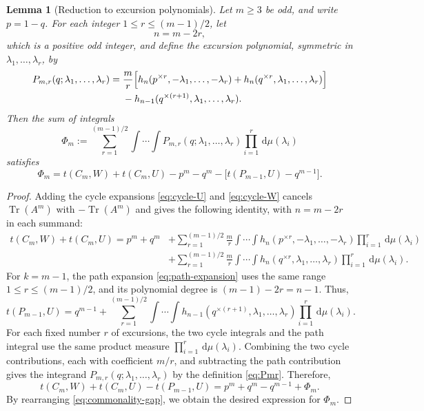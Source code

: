 \documentclass[11pt]{article}
\newtheorem{lemma}[theorem]{Lemma}
\theoremstyle{remark}
\numberwithin{equation}{section}
\newcommand{\Tr}{\operatorname{Tr}}
\newcommand{\dd}{\,\mathrm d}
\newcommand{\tC}[2]{t(C_{#1},#2)}
\newcommand{\tP}[2]{t(P_{#1},#2)}
\newcommand{\rep}[2]{#1^{\times #2}}
\begin{document}
\begin{lemma}[Reduction to excursion polynomials]
\label{lem:polynomial-reduction}
  Let $m\ge3$ be odd, and write $p=1-q$. For each integer
  $1\le r\le(m-1)/2$, let
  \begin{equation}\label{eq:pge23-n}
    n=m-2r,
  \end{equation}
  which is a positive odd integer, and define the excursion polynomial,
  symmetric in $\lambda_1,\ldots,\lambda_r$, by
  \begin{align}
    P_{m,r}(q;\lambda_1,\ldots,\lambda_r)
    ={}&\frac mr\Bigl[
      h_n(\rep pr,-\lambda_1,\ldots,-\lambda_r)
      +h_n(\rep qr,\lambda_1,\ldots,\lambda_r)
    \Bigr]\notag\\
    &-h_{n-1}(\rep q{(r+1)},\lambda_1,\ldots,\lambda_r).
    \label{eq:Pmr}
  \end{align}
  Then the sum of integrals
  \begin{equation}\label{eq:Phi-expansion}
    \Phi_m:=\sum_{r=1}^{(m-1)/2}
      \int\!\cdots\!\int
      P_{m,r}(q;\lambda_1,\ldots,\lambda_r)
      \prod_{i=1}^r\dd\mu(\lambda_i)
  \end{equation}
  satisfies
  \[
    \Phi_m=\tC mW+\tC mU-p^m-q^m
    -\bigl[\tP{m-1}U-q^{m-1}\bigr].
  \]
\end{lemma}

\begin{proof}
  Adding the cycle expansions \eqref{eq:cycle-U} and
  \eqref{eq:cycle-W} cancels $\Tr(A^m)$ with $-\Tr(A^m)$ and gives the
  following identity, with $n=m-2r$ in each summand:
  \[
    \begin{aligned}
      \tC mW+\tC mU
      ={}p^m+q^m
      &+\sum_{r=1}^{(m-1)/2}\frac mr
      \int\!\cdots\!\int
        h_n(\rep pr,-\lambda_1,\ldots,-\lambda_r)
      \prod_{i=1}^r\dd\mu(\lambda_i)\\
      &+\sum_{r=1}^{(m-1)/2}\frac mr
      \int\!\cdots\!\int
        h_n(\rep qr,\lambda_1,\ldots,\lambda_r)
      \prod_{i=1}^r\dd\mu(\lambda_i).
    \end{aligned}
  \]
  For $k=m-1$, the path expansion \eqref{eq:path-expansion} uses the
  same range $1\le r\le(m-1)/2$, and its polynomial degree is
  $(m-1)-2r=n-1$. Thus,
  \[
    \tP{m-1}U=q^{m-1}+
    \sum_{r=1}^{(m-1)/2}
      \int\!\cdots\!\int
      h_{n-1}(\rep q{(r+1)},\lambda_1,\ldots,\lambda_r)
      \prod_{i=1}^r\dd\mu(\lambda_i).
  \]
  For each fixed number $r$ of excursions, the two cycle integrals and
  the path integral use the same product measure
  $\prod_{i=1}^r\dd\mu(\lambda_i)$.
  Combining the two cycle contributions, each with coefficient $m/r$, and subtracting the path contribution gives the integrand $P_{m,r}(q;\lambda_1,\ldots,\lambda_r)$ by the definition \eqref{eq:Pmr}.
  Therefore,
  \begin{equation}\label{eq:commonality-gap}
    \tC mW+\tC mU-\tP{m-1}U
    =p^m+q^m-q^{m-1}+\Phi_m.
  \end{equation}
  By rearranging \eqref{eq:commonality-gap}, we obtain the desired expression for $\Phi_m$.
\end{proof}
\end{document}
